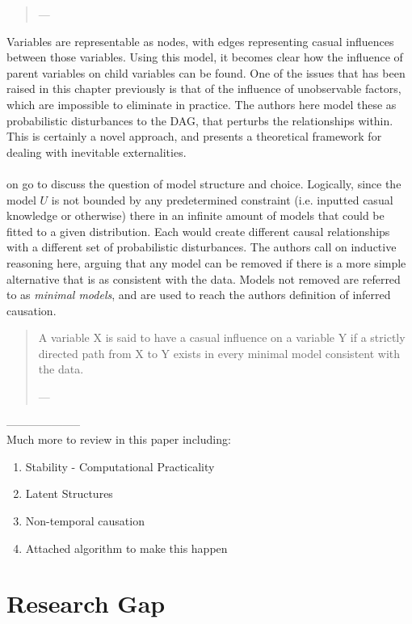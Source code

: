 {\begin{quote}
\hspace{2cm}---  \cite {pearl1995theory}
\end{quote}
Variables are representable as nodes, with edges representing casual influences between those variables. Using this model, it becomes clear how the influence of parent variables on child variables can be found. One of the issues that has been raised in this chapter previously is that of the influence of unobservable factors, which are impossible to eliminate in practice. The authors here model these as probabilistic disturbances to the DAG, that perturbs the relationships within. This is certainly a novel approach, and presents a theoretical framework for dealing with inevitable externalities.\\\\
\cite {pearl1995theory} on go to discuss the question of model structure and choice. Logically, since the model $U$ is not bounded by any predetermined constraint (i.e. inputted casual knowledge or otherwise) there in an infinite amount of models that could be fitted to a given distribution. Each would create different causal relationships with a different set of probabilistic disturbances. The authors call on inductive reasoning here, arguing that any model can be removed if there is a more simple alternative that is as consistent with the data. Models not removed are referred to as {\it minimal models}, and are used to reach the authors definition of inferred causation. 
\begin{quote}
A variable X is said to have a casual influence on a variable Y if a strictly directed path from X to Y exists in every minimal model consistent with the data. 

\hspace{2cm}---  \cite {pearl1995theory}
\end{quote}

--------------------\\
Much more to review in this paper including:
\begin{enumerate}
\item{Stability - Computational Practicality}
\item{Latent Structures}
\item{Non-temporal causation}
\item{Attached algorithm to make this happen}
\end{enumerate}
\section{Research Gap}
{}


}